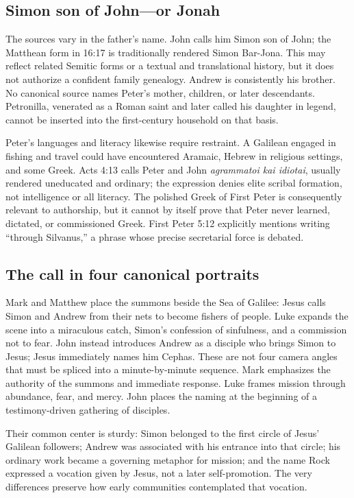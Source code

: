 \subsection{Simon son of John---or Jonah}

The sources vary in the father's name. John calls him Simon son of John; the
Matthean form in 16:17 is traditionally rendered Simon Bar-Jona. This may
reflect related Semitic forms or a textual and translational history, but it
does not authorize a confident family genealogy. Andrew is consistently his
brother. No canonical source names Peter's mother, children, or later
descendants. Petronilla, venerated as a Roman saint and later called his
daughter in legend, cannot be inserted into the first-century household on
that basis.

Peter's languages and literacy likewise require restraint. A Galilean engaged
in fishing and travel could have encountered Aramaic, Hebrew in religious
settings, and some Greek. Acts 4:13 calls Peter and John \emph{agrammatoi kai
idiotai}, usually rendered uneducated and ordinary; the expression denies
elite scribal formation, not intelligence or all literacy. The polished Greek
of First Peter is consequently relevant to authorship, but it cannot by itself
prove that Peter never learned, dictated, or commissioned Greek. First Peter
5:12 explicitly mentions writing ``through Silvanus,'' a phrase whose precise
secretarial force is debated.

\subsection{The call in four canonical portraits}

Mark and Matthew place the summons beside the Sea of Galilee: Jesus calls
Simon and Andrew from their nets to become fishers of people. Luke expands
the scene into a miraculous catch, Simon's confession of sinfulness, and a
commission not to fear. John instead introduces Andrew as a disciple who
brings Simon to Jesus; Jesus immediately names him Cephas. These are not four
camera angles that must be spliced into a minute-by-minute sequence. Mark
emphasizes the authority of the summons and immediate response. Luke frames
mission through abundance, fear, and mercy. John places the naming at the
beginning of a testimony-driven gathering of disciples.

Their common center is sturdy: Simon belonged to the first circle of Jesus'
Galilean followers; Andrew was associated with his entrance into that circle;
his ordinary work became a governing metaphor for mission; and the name Rock
expressed a vocation given by Jesus, not a later self-promotion. The very
differences preserve how early communities contemplated that vocation.

